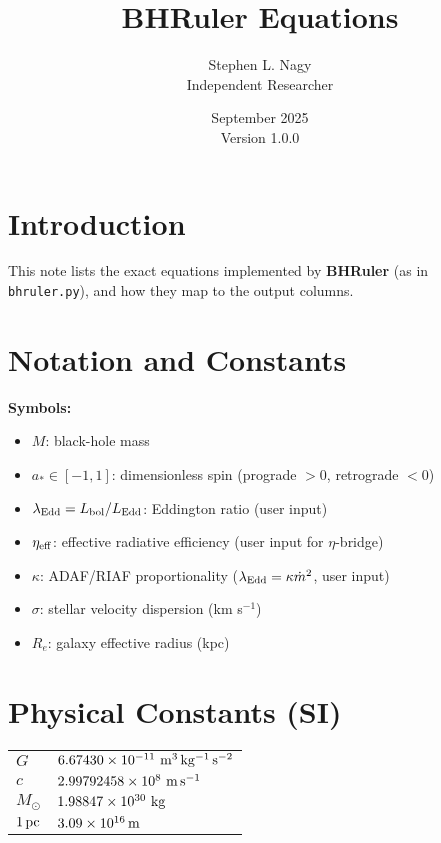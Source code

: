 \documentclass[12pt]{article}
\begin{document}
\title{BHRuler Equations}
\author{Stephen L. Nagy \\ \small{Independent Researcher}}
\date{September 2025 \\ Version 1.0.0}
\maketitle

\section*{Introduction}
This note lists the exact equations implemented by \textbf{BHRuler} (as in \texttt{bhruler.py}), and how they map to the output columns.

\section*{Notation and Constants}
\textbf{Symbols:}
\begin{itemize}
    \item $M$: black-hole mass
    \item $a_* \in [-1,1]$: dimensionless spin (prograde $>0$, retrograde $<0$)
    \item $\lambda_{\rm Edd} = L_{\rm bol}/L_{\rm Edd}$: Eddington ratio (user input)
    \item $\eta_{\rm eff}$: effective radiative efficiency (user input for $\eta$-bridge)
    \item $\kappa$: ADAF/RIAF proportionality ($\lambda_{\rm Edd} = \kappa \dot m^2$, user input)
    \item $\sigma$: stellar velocity dispersion (km s$^{-1}$)
    \item $R_e$: galaxy effective radius (kpc)
\end{itemize}

\section*{Physical Constants (SI)}
\begin{center}
\begin{tabular}{ll}
$G$ & $6.67430\times10^{-11}\ {\rm m^3\,kg^{-1}\,s^{-2}}$ \\
$c$ & $2.99792458\times10^{8}\ {\rm m\,s^{-1}}$ \\
$M_\odot$ & $1.98847\times10^{30}\ {\rm kg}$ \\
$1\,{\rm pc}$ & $3.09 \times 10^{16}\,{\rm m}$ \\
\end{tabular}
\end{center}
\end{document}
